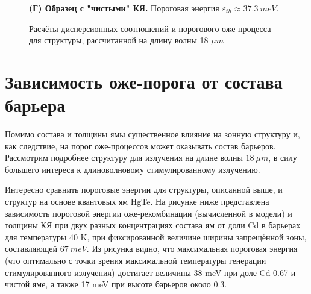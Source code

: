 \documentclass[../main.tex]{subfiles}
\begin{document}
\begin{figure}[h!]
\begin{minipage}[h]{0.49\linewidth}
\begin{center}
                    \textbf{(Г) Образец с "чистыми" КЯ.} Пороговая энергия 
                        $\varepsilon_{th} \approx 37.3~meV$.
                \end{center}
            \end{minipage}
            \caption{Расчёты дисперсионных соотношений и порогового оже-процесса
            для структуры, рассчитанной на длину волны 18 $\mu m$}
        \end{figure}

        \vspace{0.75cm}
        

        \section{Зависимость оже-порога от состава барьера}

        Помимо состава и толщины ямы существенное влияние на зонную структуру
        и, как следствие, на порог оже-процессов может оказывать состав барьеров.
        Рассмотрим подробнее структуру для излучения на длине волны $18~\mu m$,
        в силу большего интереса к длиноволновому стимулированному излучению.

        Интересно сравнить пороговые энергии для структуры, описанной выше, и структур на основе квантовых ям HgTe. На рисунке ниже представлена 
        зависимость пороговой энергии оже-рекомбинации (вычисленной в модели) и толщины КЯ при двух разных концентрациях состава ям
        от доли Cd в барьерах для температуры 40 K, 
        при фиксированной величине ширины запрещённой зоны, составляющей $67~meV$. Из рисунка видно, что максимальная пороговая энергия (что оптимально 
        с точки зрения максимальной температуры генерации стимулированного излучения) достигает величины 38 meV при доле Cd 0.67 и чистой яме, а также 
        17 meV при высоте барьеров около 0.3.
\end{document}
